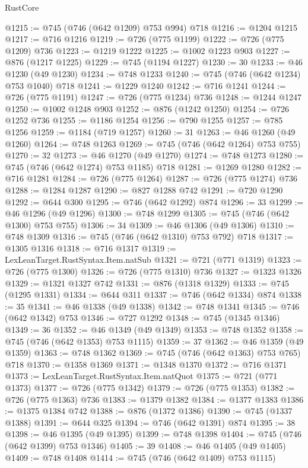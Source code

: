 \begin{lexlean}{RustCore}
\begin{coremodule}
@1215 := @745 (@746 (@642 @1209) @753 @994) @718
@1216 := @1204 @1215
@1217 := @716 @1216
@1219 := @726 (@775 @1199)
@1222 := @726 (@775 @1209) @736
@1223 := @1219 @1222
@1225 := @1002 @1223 @903
@1227 := @876 (@1217 @1225)
@1229 := @745 (@1194 @1227)
@1230 := 30
@1233 := @46 @1230 (@49 @1230)
@1234 := @748 @1233
@1240 := @745 (@746 (@642 @1234) @753 @1040) @718
@1241 := @1229 @1240
@1242 := @716 @1241
@1244 := @726 (@775 @1191)
@1247 := @726 (@775 @1234) @736
@1248 := @1244 @1247
@1250 := @1002 @1248 @903
@1252 := @876 (@1242 @1250)
@1254 := @726 @1252 @736
@1255 := @1186 @1254
@1256 := @790 @1255
@1257 := @785 @1256
@1259 := @1184 (@719 @1257)
@1260 := 31
@1263 := @46 @1260 (@49 @1260)
@1264 := @748 @1263
@1269 := @745 (@746 (@642 @1264) @753 @755)
@1270 := 32
@1273 := @46 @1270 (@49 @1270)
@1274 := @748 @1273
@1280 := @745 (@746 (@642 @1274) @753 @1185) @718
@1281 := @1269 @1280
@1282 := @716 @1281
@1284 := @726 (@775 @1264)
@1287 := @726 (@775 @1274) @736
@1288 := @1284 @1287
@1290 := @827 @1288 @742
@1291 := @720 @1290
@1292 := @644 @300
@1295 := @746 (@642 @1292) @874
@1296 := 33
@1299 := @46 @1296 (@49 @1296)
@1300 := @748 @1299
@1305 := @745 (@746 (@642 @1300) @753 @755)
@1306 := 34
@1309 := @46 @1306 (@49 @1306)
@1310 := @748 @1309
@1316 := @745 (@746 (@642 @1310) @753 @792) @718
@1317 := @1305 @1316
@1318 := @716 @1317
@1319 := LexLeanTarget.RustSyntax.Item.natSub
@1321 := @721 (@771 @1319)
@1323 := @726 (@775 @1300)
@1326 := @726 (@775 @1310) @736
@1327 := @1323 @1326
@1329 := @1321 @1327 @742
@1331 := @876 (@1318 @1329)
@1333 := @745 (@1295 @1331)
@1334 := @644 @311
@1337 := @746 (@642 @1334) @874
@1338 := 35
@1341 := @46 @1338 (@49 @1338)
@1342 := @748 @1341
@1345 := @746 (@642 @1342) @753
@1346 := @727 @1292
@1348 := @745 (@1345 @1346)
@1349 := 36
@1352 := @46 @1349 (@49 @1349)
@1353 := @748 @1352
@1358 := @745 (@746 (@642 @1353) @753 @1115)
@1359 := 37
@1362 := @46 @1359 (@49 @1359)
@1363 := @748 @1362
@1369 := @745 (@746 (@642 @1363) @753 @765) @718
@1370 := @1358 @1369
@1371 := @1348 @1370
@1372 := @716 @1371
@1373 := LexLeanTarget.RustSyntax.Item.natQuot
@1375 := @721 (@771 @1373)
@1377 := @726 (@775 @1342)
@1379 := @726 (@775 @1353)
@1382 := @726 (@775 @1363) @736
@1383 := @1379 @1382
@1384 := @1377 @1383
@1386 := @1375 @1384 @742
@1388 := @876 (@1372 @1386)
@1390 := @745 (@1337 @1388)
@1391 := @644 @325
@1394 := @746 (@642 @1391) @874
@1395 := 38
@1398 := @46 @1395 (@49 @1395)
@1399 := @748 @1398
@1404 := @745 (@746 (@642 @1399) @753 @1346)
@1405 := 39
@1408 := @46 @1405 (@49 @1405)
@1409 := @748 @1408
@1414 := @745 (@746 (@642 @1409) @753 @1115)

\end{coremodule}
\end{lexlean}
